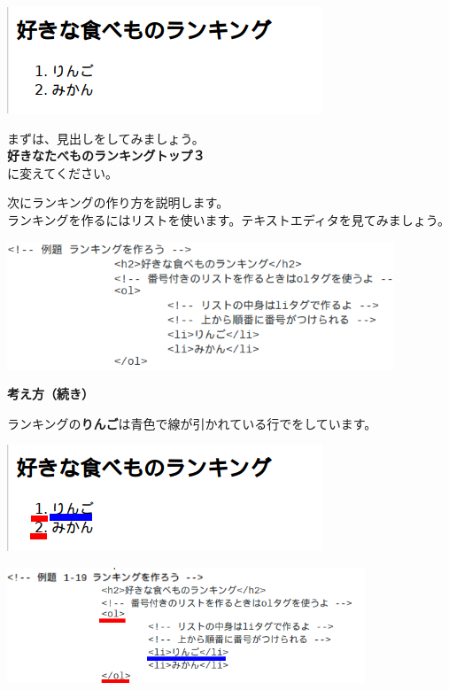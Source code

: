 \documentclass[a4paper,12pt]{jarticle}
\begin{document}
\bigskip

\includegraphics[width=9.417cm,height=3.173cm]{textbook-img179.png}

\bigskip

まずは、見出しをしてみましょう。\\
\textbf{好きなたべものランキングトップ３}\\
に変えてください。


\bigskip

次にランキングの作り方を説明します。\\
ランキングを作るにはリストを使います。テキストエディタを見てみましょう。

\centering
\includegraphics[width=11.553cm,height=3.812cm]{textbook-img180.png}

\clearpage
\flushleft
\textbf{考え方（続き）}


\bigskip


ランキングの\textbf{りんご}は青色で線が引かれている行でをしています。


\bigskip


\includegraphics[width=9.417cm,height=3.173cm]{textbook-img182.png}


\bigskip


\includegraphics[width=10.694cm,height=3.431cm]{textbook-img181.png}
\end{document}
